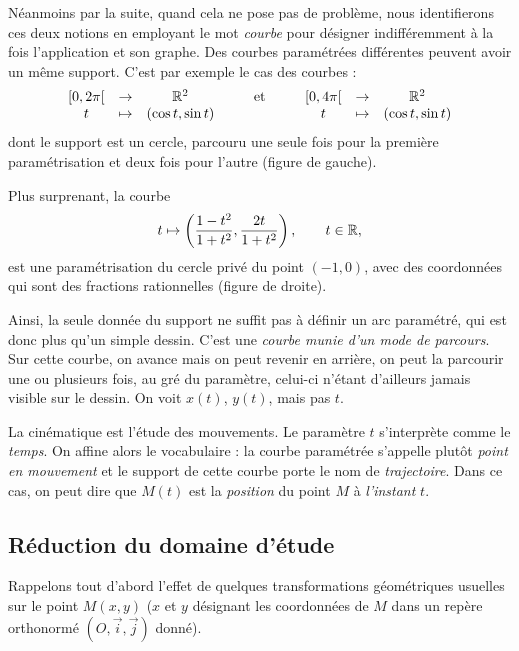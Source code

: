 \documentclass[class=report,crop=false]{standalone}
\begin{document}
Néanmoins par la suite, quand cela ne pose pas de problème, nous identifierons
ces deux notions en employant le mot \emph{courbe}
pour désigner indifféremment à la fois l'application et son graphe.
Des courbes paramétrées différentes peuvent avoir un même support. C'est par exemple
le cas des courbes :
$$\begin{array}[t]{ccc}
[0,2\pi[&\rightarrow&\mathbb{R}^2\\
t&\mapsto&(\cos t,\sin t)
\end{array} \qquad \text{ et } \qquad \begin{array}[t]{ccc}
[0,4\pi[&\rightarrow&\mathbb{R}^2\\
t&\mapsto&(\cos t,\sin t)
\end{array}$$
dont le support est un cercle, parcouru une seule fois pour la première paramétrisation
et deux fois pour l'autre (figure de gauche).


Plus surprenant, la courbe
$$t\mapsto \left(\frac{1-t^2}{1+t^2},\frac{2t}{1+t^2}\right), \qquad t\in\mathbb{R},$$
est une paramétrisation du cercle privé du point $(-1,0)$,
avec des coordonnées qui sont des fractions rationnelles (figure de droite).


Ainsi, la seule donnée du support ne suffit pas à définir un arc
paramétré, qui est donc plus qu'un simple dessin.
C'est une \emph{courbe munie d'un mode de parcours}. Sur cette courbe, on avance
mais on peut revenir en arrière, on peut la parcourir une ou plusieurs fois, au gré du
paramètre, celui-ci n'étant d'ailleurs jamais visible sur le dessin.
On \og voit \fg{} $x(t)$, $y(t)$, mais pas $t$.

\bigskip

 La cinématique est l'étude des mouvements.
Le paramètre $t$ s'interprète comme le \emph{temps}. On affine alors
le vocabulaire : la courbe paramétrée s'appelle plutôt \emph{point en mouvement}
et le support de cette courbe porte le nom de \emph{trajectoire}. Dans ce cas,
on peut dire que $M(t)$ est la \emph{position} du point $M$ à \emph{l'instant} $t$.



\subsection{Réduction du domaine d'étude}


Rappelons tout d'abord l'effet de quelques transformations
géométriques usuelles sur le point $M(x,y)$ ($x$ et $y$ désignant
les coordonnées de $M$ dans un repère orthonormé $(O,\vec{i},\vec{j})$ donné).
\end{document}
